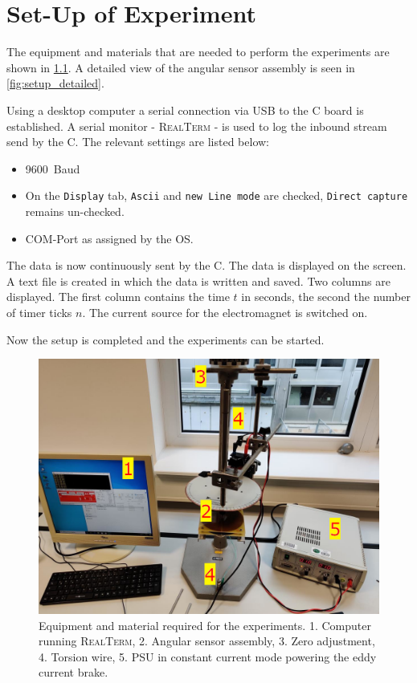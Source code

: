 \chapter{Set-Up of Experiment}
%
	The equipment and materials that are needed to perform the experiments are shown in \cref{fig:setup_total}. A detailed
	view of the angular sensor assembly is seen in \cref{fig:setup_detailed}.\par
	Using a desktop computer a serial connection via USB to the \micro C board is established. A serial monitor - \textsc{RealTerm} - is used to
	log the inbound stream send by the \micro C. The relevant settings are listed below:\par
	\begin{itemize}
		\item \SI{9600}{Baud}
		\item On the \texttt{Display} tab, \texttt{Ascii} and \texttt{new Line mode} are checked, \texttt{Direct capture}
		remains un-checked.
		\item COM-Port as assigned by the OS.
	\end{itemize}
	The data is now continuously sent by the \micro C. The data is displayed on the screen. A text file is created in
	which the data is written and saved. Two columns are displayed. The first column contains the time $t$ in seconds, the
	second the number of timer ticks $n$. The current source for the electromagnet is switched on.\par
	Now the setup is completed and the experiments can be started.
	\begin{figure}[h]
		\centering
		\includegraphics[width=.8\textwidth]{aufbau/setup_total_num.jpg}
		\caption[Equipment used.]{ Equipment and material required for the experiments. 1. Computer running \textsc{RealTerm}, 2. Angular sensor assembly,
		3. Zero adjustment, 4. Torsion wire, 5. PSU in constant current mode powering the eddy current brake.}
		\label{fig:setup_total}
	\end{figure}
